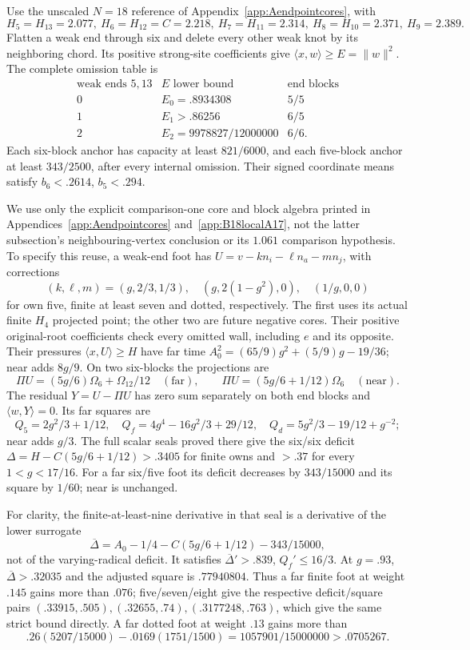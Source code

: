 \documentclass[11pt]{article}
\theoremstyle{definition}
\theoremstyle{remark}
\newcommand{\ip}[2]{\langle #1,#2\rangle}
\newcommand{\norm}[1]{\lVert #1\rVert}
\begin{document}
Use the unscaled \(N=18\) reference of
Appendix~\ref{app:Aendpointcores}, with
\[
 H_5=H_{13}=2.077,\ H_6=H_{12}=C=2.218,
 \ H_7=H_{11}=2.314,\ H_8=H_{10}=2.371,\ H_9=2.389.
\]
Flatten a weak end through six and delete every other weak knot by
its neighboring chord. Its positive strong-site coefficients give
\(\ip xw\ge E=\norm w^2\). The complete omission table is
\[
\begin{array}{c|c|c}
\text{weak ends }5,13&E\text{ lower bound}&\text{end blocks}\\\hline
0&E_0=.8934308&5/5\\
1&E_1>.86256&6/5\\
2&E_2=9978827/12000000&6/6.
\end{array}
\]
Each six-block anchor has capacity at least \(821/6000\), and each
five-block anchor at least \(343/2500\), after every internal omission.
Their signed coordinate means satisfy \(b_6<.2614\), \(b_5<.294\).

We use only the explicit comparison-one core and block algebra printed
in Appendices~\ref{app:Aendpointcores} and~\ref{app:B18localA17},
not the latter subsection's neighbouring-vertex conclusion or its
\(1.061\) comparison hypothesis. To specify this reuse, a weak-end
foot has \(U=v-k n_i-\ell n_a-m n_j\), with corrections
\[
 (k,\ell,m)=(g,2/3,1/3),\quad
 (g,2(1-g^2),0),\quad(1/g,0,0)
\]
for own five, finite at least seven and dotted, respectively.
The first uses its actual finite \(H_4\) projected point; the other
two are future negative cores. Their positive original-root
coefficients check every omitted wall, including \(e\) and its
opposite. Their pressures \(\ip xU\ge H\) have far time
\(A_0^2=(65/9)g^2+(5/9)g-19/36\); near adds \(8g/9\).
On two six-blocks the projections are
\[
 \Pi U=(5g/6)\Omega_6+\Omega_{12}/12\quad(\text{far}),\qquad
 \Pi U=(5g/6+1/12)\Omega_6\quad(\text{near}).
\]
The residual \(Y=U-\Pi U\) has zero sum separately on both end
blocks and \(\ip wY=0\). Its far squares are
\[
 Q_5=2g^2/3+1/12,\quad
 Q_f=4g^4-16g^2/3+29/12,\quad
 Q_d=5g^2/3-19/12+g^{-2};
\]
near adds \(g/3\). The full scalar seals proved there give the
six/six deficit \(\Delta=H-C(5g/6+1/12)>.3405\) for finite
owns and \(>.37\) for every \(1<g<17/16\).
For a far six/five foot its deficit decreases by \(343/15000\)
and its square by \(1/60\); near is unchanged.

For clarity, the finite-at-least-nine derivative in that seal is a
derivative of the lower surrogate
\[
 \overline\Delta=A_0-1/4-C(5g/6+1/12)-343/15000,
\]
not of the varying-radical deficit. It satisfies
\(\overline\Delta'>.839\), \(Q_f'\le16/3\).
At \(g=.93\), \(\overline\Delta>.32035\) and the adjusted
square is \(.77940804\). Thus a far finite foot at weight
\(.145\) gains more than \(.076\); five/seven/eight give
the respective deficit/square pairs
\((.33915,.505),(.32655,.74),(.3177248,.763)\), which give
the same strict bound directly. A far dotted foot at weight \(.13\)
gains more than
\[
 .26(5207/15000)-.0169(1751/1500)
           =1057901/15000000>.0705267.
\]
\end{document}
